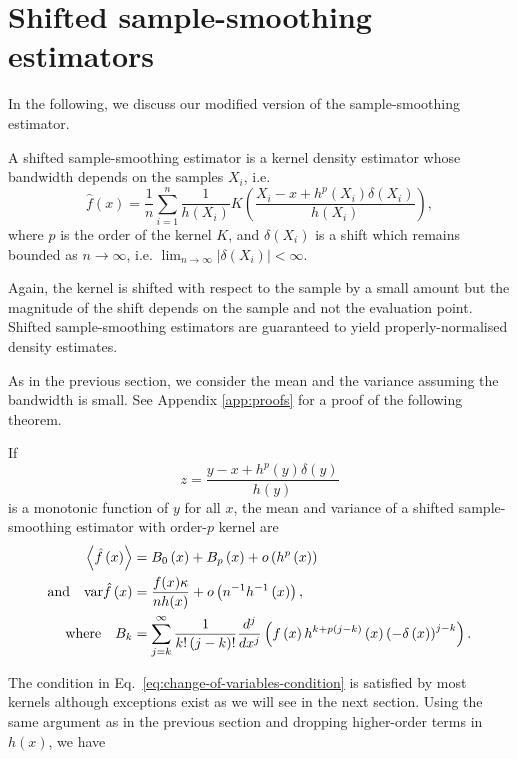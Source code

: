 \section{Shifted sample-smoothing estimators\label{sec:smoothing}}

In the following, we discuss our modified version of the sample-smoothing estimator.
\begin{defn}
A shifted sample-smoothing estimator is a kernel density estimator whose bandwidth depends on the samples $X_{i}$, i.e. 
\begin{equation}
\hat{f}\left(x\right)=\frac{1}{n}\sum_{i=1}^{n}\frac{1}{h\left(X_{i}\right)}K\left(\frac{X_{i}-x+h^{p}\left(X_{i}\right)\delta\left(X_{i}\right)}{h\left(X_{i}\right)}\right),\label{eq:smoothing-definition}
\end{equation}
where $p$ is the order of the kernel $K$, and $\delta(X_{i})$ is a shift which remains bounded as $n\rightarrow\infty$, i.e. $\lim_{n\rightarrow\infty}\left|\delta\left(X_{i}\right)\right|<\infty$.
\end{defn}
Again, the kernel is shifted with respect to the sample by a small amount but the magnitude of the shift depends on the sample and not the evaluation point. Shifted sample-smoothing estimators are guaranteed to yield properly-normalised density estimates.

As in the previous section, we consider the mean and the variance assuming the bandwidth is small. See Appendix \ref{app:proofs} for a proof of the following theorem.
\begin{thm}
\label{thm:smoothing-moments} If 
\begin{equation}
z=\frac{y-x+h^{p}\left(y\right)\delta\left(y\right)}{h\left(y\right)}\label{eq:change-of-variables-condition}
\end{equation}
is a monotonic function of $y$ for all $x$, the mean and variance of a shifted sample-smoothing estimator with order-$p$ kernel are 
\begin{align}
\left\langle \hat{f}\left(x\right)\right\rangle  & =B_{0}\left(x\right)+B_{p}\left(x\right)+o\left(h^{p}\left(x\right)\right)\nonumber \\
\text{and}\quad\mathrm{var}\hat{f}\left(x\right) & =\frac{f(x)\kappa}{nh(x)}+o\left(n^{-1}h^{-1}\left(x\right)\right),\label{eq:smoothing-var}\\
\text{where}\quad B_{k} & =\sum_{j=k}^{\infty}\frac{1}{k!\left(j-k\right)!}\frac{d^{j}}{dx^{j}}\left(f\left(x\right)h^{k+p\left(j-k\right)}\left(x\right)\left(-\delta\left(x\right)\right)^{j-k}\right).\nonumber 
\end{align}

\end{thm}
The condition in Eq.~\eqref{eq:change-of-variables-condition} is satisfied by most kernels although exceptions exist as we will see in the next section. Using the same argument as in the previous section and dropping higher-order terms in $h\left(x\right)$, we have

